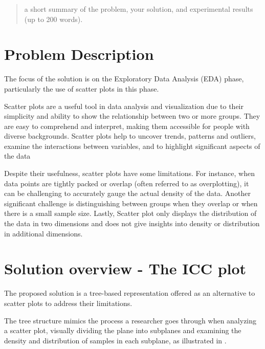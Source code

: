 \documentclass[12pt]{article}
\begin{document}
\maketitle

\begin{abstract}
a short summary of the problem, your solution, and experimental results (up to 200 words).
\end{abstract}

\section{Problem Description}\label{Problem Description}
The focus of the solution is on the Exploratory Data Analysis (EDA) phase, particularly the use of scatter plots in this phase.

Scatter plots are a useful tool in data analysis and visualization due to their simplicity and ability to show the relationship between two or more groups. They are easy to comprehend and interpret, making them accessible for people with diverse backgrounds. Scatter plots help to uncover trends, patterns and outliers, examine the interactions between variables, and to highlight significant aspects of the data

Despite their usefulness, scatter plots have some limitations. For instance, when data points are tightly packed or overlap (often referred to as overplotting), it can be challenging to accurately gauge the actual density of the data. Another significant challenge is distinguishing between groups when they overlap or when there is a small sample size. Lastly, Scatter plot only displays the distribution of the data in two dimensions and does not give insights into density or distribution in additional dimensions.

\section{Solution overview - The ICC plot}\label{Solution overview}
The proposed solution is a tree-based representation offered as an alternative to scatter plots to address their limitations.

The tree structure mimics the process a researcher goes through when analyzing a scatter plot, visually dividing the plane into subplanes and examining the density and distribution of samples in each subplane, as illustrated in .
\end{document}
